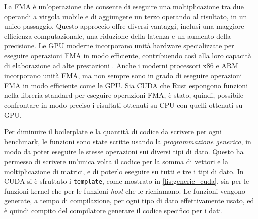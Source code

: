 
La \gls{FMA} è un'operazione che consente di eseguire una moltiplicazione tra due operandi a virgola mobile e di aggiungere un terzo operando al risultato, in un unico passaggio. Questo approccio offre diversi vantaggi, inclusi una maggiore efficienza computazionale, una riduzione della latenza e un aumento della precisione. Le \gls{GPU} moderne incorporano unità hardware specializzate per eseguire operazioni \gls{FMA} in modo efficiente, contribuendo così alla loro capacità di elaborazione ad alte prestazioni \cite[]{NVIDIA:fma}. Anche i moderni processori x86 e ARM incorporano unità \gls{FMA}, ma non sempre sono in grado di eseguire operazioni \gls{FMA} in modo efficiente come le \gls{GPU}. Sia \gls{CUDA} che Rust espongono funzioni nella libreria standard per eseguire operazioni \gls{FMA}, è stato, quindi, possibile confrontare in modo preciso i risultati ottenuti su \gls{CPU} con quelli ottenuti su \gls{GPU}.


Per diminuire il boilerplate e la quantità di codice da scrivere per ogni benchmark, le funzioni sono state scritte usando la \textit{programmazione generica}, in modo da poter eseguire le stesse operazioni sui diversi tipi di dato. Questo ha permesso di scrivere un'unica volta il codice per la somma di vettori e la moltiplicazione di matrici, e di poterlo eseguire su tutti e tre i tipi di dato. In \gls{CUDA} si è sfruttato i \verb|template|, come mostrato in \ref{lis:generic_cuda}, sia per le funzioni kernel che per le funzioni \textit{host} che le richiamano. Le funzioni vengono generate, a tempo di compilazione, per ogni tipo di dato effettivamente usato, ed è quindi compito del compilatore generare il codice specifico per i dati.

